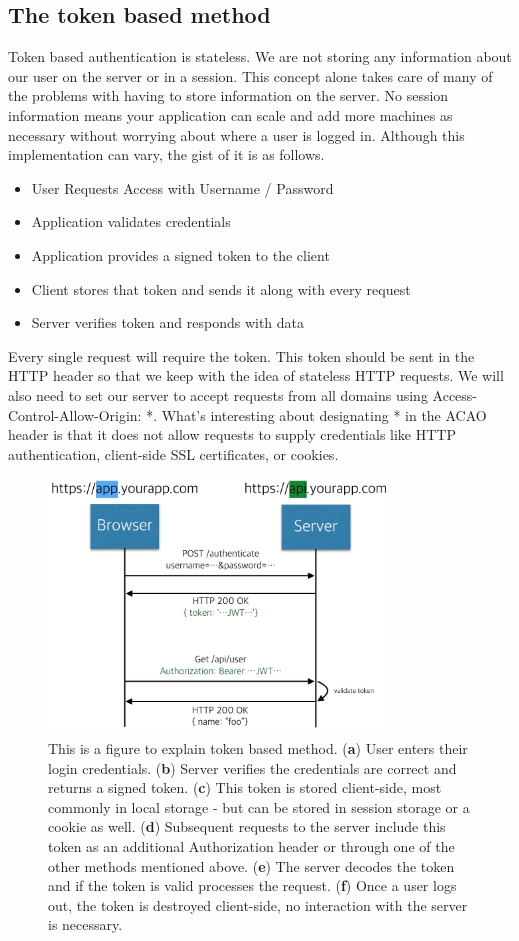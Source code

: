 \documentclass[journal,article,submit,moreauthors,pdftex,10pt,a4paper]{mdpi}
\begin{document}
\subsection{The token based method}
Token based authentication is stateless. We are not storing any information about our user on the server or in a session. This concept alone takes care of many of the problems with having to store information on the server\cite{one-time-cookies}.
No session information means your application can scale and add more machines as necessary without worrying about where a user is logged in.
Although this implementation can vary, the gist of it is as follows.
\begin{itemize}[leftmargin=*,labelsep=4mm]
\item User Requests Access with Username / Password
\item Application validates credentials
\item Application provides a signed token to the client
\item Client stores that token and sends it along with every request
\item Server verifies token and responds with data
\end{itemize}

Every single request will require the token. This token should be sent in the HTTP header so that we keep with the idea of stateless HTTP requests. We will also need to set our server to accept requests from all domains using Access-Control-Allow-Origin: *. What’s interesting about designating * in the ACAO header is that it does not allow requests to supply credentials like HTTP authentication, client-side SSL certificates, or cookies.

\begin{figure}[H]
\centering
\includegraphics[width=9cm]{figures/tokenbased}
\caption{This is a figure to explain token based method. (\textbf{a}) User enters their login credentials. (\textbf{b}) Server verifies the credentials are correct and returns a signed token. (\textbf{c}) This token is stored client-side, most commonly in local storage - but can be stored in session storage or a cookie as well. (\textbf{d}) Subsequent requests to the server include this token as an additional Authorization header or through one of the other methods mentioned above. (\textbf{e}) The server decodes the token and if the token is valid processes the request. (\textbf{f}) Once a user logs out, the token is destroyed client-side, no interaction with the server is necessary.}
\label{tokenbased}
\end{figure}
\end{document}
